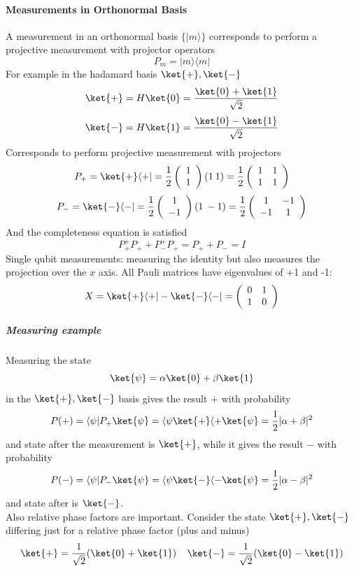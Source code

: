 \documentclass[10pt]{report}
\begin{document}
\paragraph{Measurements in Orthonormal Basis} A measurement in an orthonormal basis $\{|m\rangle\}$ corresponds to perform a projective measurement with projector operators $$P_m=|m\rangle\langle m|$$
For example in the hadamard basis $\ket{+}, \ket{-}$
$$\ket{+} = H\ket{0} = \frac{\ket{0}+\ket{1}}{\sqrt{2}}$$
$$\ket{-} = H\ket{1} = \frac{\ket{0}-\ket{1}}{\sqrt{2}}$$
Corresponds to perform projective measurement with projectors
$$P_+ = \ket{+}\langle +| = \frac{1}{2}\left(\begin{array}{c}
1\\1
\end{array}\right) (1\:1) = \frac{1}{2}\left(\begin{array}{c c}
1&1\\1&1
\end{array}\right)$$
$$P_- = \ket{-}\langle -| = \frac{1}{2}\left(\begin{array}{c}
1\\-1
\end{array}\right) (1\:-1) = \frac{1}{2}\left(\begin{array}{c c}
1&-1\\-1&1
\end{array}\right)$$
And the completeness equation is satisfied $$P_+^+P_+ + P_-^+P_+ = P_+ + P_- = I$$
Single qubit measurements: measuring the identity but also measures the projection over the $x$ axis. All Pauli matrices have eigenvalues of +1 and -1:
$$X = \ket{+}\langle +| - \ket{-}\langle -| = \left(\begin{array}{c c}
0&1\\1&0
\end{array}\right)$$
\subparagraph{Measuring example} Measuring the state $$\ket{\psi} =\alpha\ket{0} + \beta\ket{1}$$
in the $\ket{+},\ket{-}$ basis gives the result $+$ with probability $$P(+) = \langle\psi|P_+\ket{\psi} = \langle\psi\ket{+}\langle+\ket{\psi} = \frac{1}{2}|\alpha + \beta|^2$$ %
and state after the measurement is $\ket{+}$, while it gives the result $-$ with probability $$P(-) = \langle\psi|P_-\ket{\psi} = \langle\psi\ket{-}\langle-\ket{\psi} = \frac{1}{2}|\alpha - \beta|^2$$ %
and state after is $\ket{-}$.\\
Also relative phase factors are important. Consider the state $\ket{+},\ket{-}$ differing just for a relative phase factor (plus and minus)
$$\ket{+} = \frac{1}{\sqrt{2}}(\ket{0} + \ket{1})\:\:\:\:\:\ket{-} = \frac{1}{\sqrt{2}}(\ket{0} - \ket{1})$$
\end{document}
